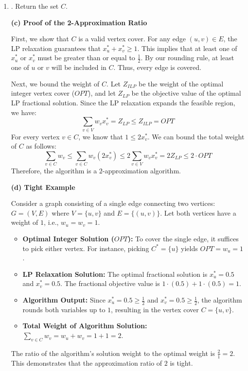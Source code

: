 \documentclass[12pt,a4paper]{article}
\makeatletter
\newtheorem*{solution}{Solution}
\theoremstyle{definition}
\renewenvironment{solution}[1][Solution] {\par\pushQED{\qed}\normalfont\topsep6\p@\@plus6\p@\relax\trivlist\item[\hskip\labelsep\bfseries#1\@addpunct{.}]\ignorespaces}{\popQED\endtrivlist\@endpefalse} \makeatother
\makeatother
\begin{document}
\begin{enumerate}
\begin{solution}
      3. Return the set $C$.

  \textbf{(c) Proof of the 2-Approximation Ratio}

  First, we show that $C$ is a valid vertex cover. For any edge $(u,v) \in E$, the LP relaxation guarantees that $x_u^* + x_v^* \ge 1$. This implies that at least one of $x_u^*$ or $x_v^*$ must be greater than or equal to $\frac{1}{2}$. By our rounding rule, at least one of $u$ or $v$ will be included in $C$. Thus, every edge is covered.

  Next, we bound the weight of $C$. Let $Z_{ILP}$ be the weight of the optimal integer vertex cover ($OPT$), and let $Z_{LP}$ be the objective value of the optimal LP fractional solution. Since the LP relaxation expands the feasible region, we have:
  \[
  \sum_{v \in V} w_v x_v^* = Z_{LP} \le Z_{ILP} = OPT
  \]
  For every vertex $v \in C$, we know that $1 \le 2x_v^*$. We can bound the total weight of $C$ as follows:
  \[
  \sum_{v \in C} w_v \le \sum_{v \in C} w_v (2x_v^*) \le 2 \sum_{v \in V} w_v x_v^* = 2 Z_{LP} \le 2 \cdot OPT
  \]
  Therefore, the algorithm is a $2$-approximation algorithm.

  \textbf{(d) Tight Example}

  Consider a graph consisting of a single edge connecting two vertices: $G = (V,E)$ where $V = \{u, v\}$ and $E = \{(u,v)\}$. Let both vertices have a weight of $1$, i.e., $w_u = w_v = 1$.

  \begin{itemize}
      \item \textbf{Optimal Integer Solution ($OPT$):} To cover the single edge, it suffices to pick either vertex. For instance, picking $C^* = \{u\}$ yields $OPT = w_u = 1$.
      \item \textbf{LP Relaxation Solution:} The optimal fractional solution is $x_u^* = 0.5$ and $x_v^* = 0.5$. The fractional objective value is $1 \cdot (0.5) + 1 \cdot (0.5) = 1$.
      \item \textbf{Algorithm Output:} Since $x_u^* = 0.5 \ge \frac{1}{2}$ and $x_v^* = 0.5 \ge \frac{1}{2}$, the algorithm rounds both variables up to $1$, resulting in the vertex cover $C = \{u, v\}$.
      \item \textbf{Total Weight of Algorithm Solution:} $\sum_{v \in C} w_v = w_u + w_v = 1 + 1 = 2$.
  \end{itemize}
  The ratio of the algorithm's solution weight to the optimal weight is $\frac{2}{1} = 2$. This demonstrates that the approximation ratio of $2$ is tight.
  \end{solution}

\end{enumerate}

\end{document}
